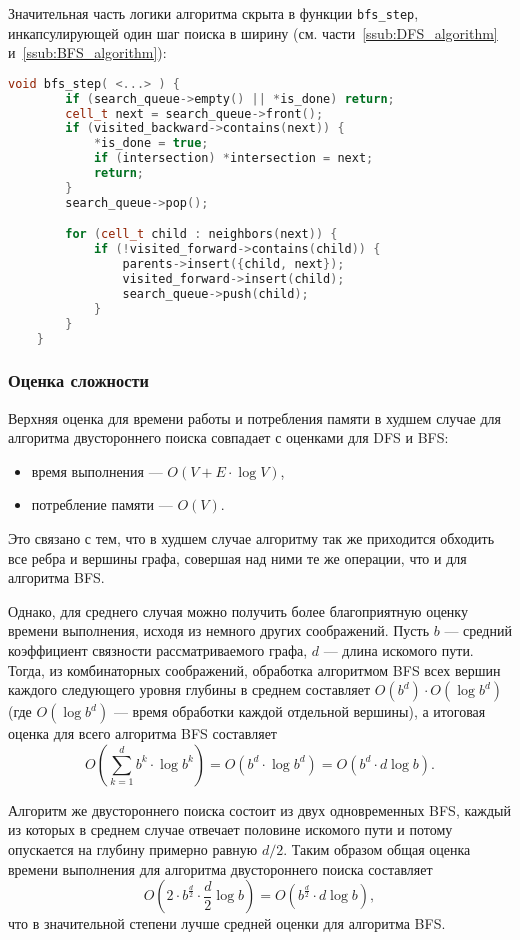 \documentclass[a4paper, 12pt]{article}
\begin{document}
Значительная часть логики алгоритма скрыта в функции \verb|bfs_step|, инкапсулирующей один шаг поиска в ширину (см. части~\ref{ssub:DFS_algorithm} и~\ref{ssub:BFS_algorithm}):
\begin{lstlisting}[language=C++]
    void bfs_step( <...> ) {
        if (search_queue->empty() || *is_done) return;
        cell_t next = search_queue->front();
        if (visited_backward->contains(next)) {
            *is_done = true;
            if (intersection) *intersection = next;
            return;
        }
        search_queue->pop();

        for (cell_t child : neighbors(next)) {
            if (!visited_forward->contains(child)) {
                parents->insert({child, next});
                visited_forward->insert(child);
                search_queue->push(child);
            }
        }
    }
\end{lstlisting}

\subsubsection{Оценка сложности}
\label{ssub:bi_BFS_complexity}
Верхняя оценка для времени работы и потребления памяти в худшем случае для алгоритма двустороннего поиска совпадает с оценками для DFS и BFS:
\begin{itemize}
    \item время выполнения --- \({ O(V + E \cdot \log V) }\),
    \item потребление памяти --- \({ O(V) }\).
\end{itemize}
Это связано с тем, что в худшем случае алгоритму так же приходится обходить все ребра и вершины графа, совершая над ними те же операции, что и для алгоритма BFS.

Однако, для среднего случая можно получить более благоприятную оценку времени выполнения, исходя из немного других соображений. Пусть \({ b }\) --- средний коэффициент связности рассматриваемого графа, \({ d }\) --- длина искомого пути. Тогда, из комбинаторных соображений, обработка алгоритмом BFS всех вершин каждого следующего уровня глубины в среднем составляет \({ O(b^d) \cdot O(\log b^d) }\) (где \({ O(\log b^d) }\) --- время обработки каждой отдельной вершины), а итоговая оценка для всего алгоритма BFS составляет
\[
    O\left(\sum_{k=1}^{d} b^{k} \cdot \log b^{k}\right) = O(b^d \cdot \log b^{d}) = O(b^{d} \cdot d\log b).
\]

Алгоритм же двустороннего поиска состоит из двух одновременных BFS, каждый из которых в среднем случае отвечает половине искомого пути и потому опускается на глубину примерно равную \({ d/2 }\). Таким образом общая оценка времени выполнения для алгоритма двустороннего поиска составляет
\[
    O(2 \cdot b^{\frac{d}{2}} \cdot \frac{d}{2} \log b) = O(b^{\frac{d}{2}} \cdot d\log b),
\]
что в значительной степени лучше средней оценки для алгоритма BFS.
\end{document}
